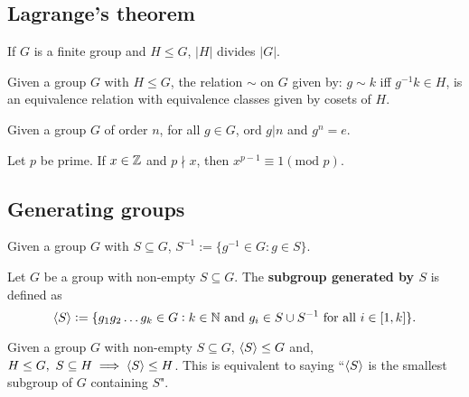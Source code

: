 \documentclass[../Year1/Year1.tex]{subfiles}
\begin{document}
\subsection{Lagrange's theorem}

\begin{theorem}
    If $G$ is a finite group and $H\leq G$, $|H|$ divides $|G|$.
\end{theorem}

\begin{corollary}
    Given a group $G$ with $H\leq G$, the relation $\sim$ on $G$ given by: $g\sim k$ iff $g^{-1}k\in H$, is an equivalence relation with equivalence classes given by cosets of $H$.
\end{corollary}

\begin{corollary}
    Given a group $G$ of order $n$, for all $g\in G$, $\text{ord }g|n$ and $g^n=e$.
\end{corollary}

\begin{corollary}
    Let $p$ be prime. If $x\in\mathbb{Z}$ and $p\nmid x$, then $x^{p-1}\equiv 1 (\text{mod }p)$.
\end{corollary}

\subsection{Generating groups}

\begin{definition}
    Given a group $G$ with $S\subseteq G$, $S^{-1}:=\{g^{-1}\in G:g\in S\}$.
\end{definition}

\begin{definition}
    Let $G$ be a group with non-empty $S\subseteq G$. The \textbf{subgroup generated by $S$} is defined as \[
        \abr{S} := \{g_1g_2\ldots g_k\in G: k\in\NN \ \text{\textcolor{black}{and }} g_i\in S\cup S^{-1} \ \text{\textcolor{black}{for all }} i\in[1,k]\}
        \textcolor{black}{.}
    \]
\end{definition}

\begin{lemma}
    Given a group $G$ with non-empty $S\subseteq G$, $\left\langle S \right\rangle\leq G$ and, $H\leq G, \ S\subseteq H \implies \left\langle S \right\rangle \leq H$. This is equivalent to saying ``$\left\langle S \right\rangle$ is the smallest subgroup of $G$ containing $S$".
\end{lemma}
\end{document}
